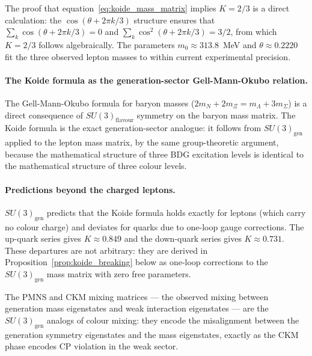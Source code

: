 \documentclass[11pt,a4paper]{article}
\begin{document}
The proof that equation~\eqref{eq:koide_mass_matrix} implies $K = 2/3$
is a direct calculation: the $\cos(\theta + 2\pi k/3)$ structure ensures
that $\sum_k \cos(\theta + 2\pi k/3) = 0$ and
$\sum_k \cos^2(\theta + 2\pi k/3) = 3/2$, from which $K = 2/3$ follows
algebraically. The parameters $m_0 \approx 313.8$~MeV and $\theta \approx
0.2220$ fit the three observed lepton masses to within current experimental
precision.

\paragraph{The Koide formula as the generation-sector Gell-Mann-Okubo relation.}
The Gell-Mann-Okubo formula for baryon masses ($2m_N + 2m_\Xi = m_\Lambda + 3m_\Sigma$)
is a direct consequence of $SU(3)_{\mathrm{flavour}}$ symmetry on the baryon
mass matrix. The Koide formula is the exact generation-sector analogue: it
follows from $SU(3)_{\mathrm{gen}}$ applied to the lepton mass matrix, by
the same group-theoretic argument, because the mathematical structure of three
BDG excitation levels is identical to the mathematical structure of three
colour levels.

\paragraph{Predictions beyond the charged leptons.}
$SU(3)_{\mathrm{gen}}$ predicts that the Koide formula holds exactly for
leptons (which carry no colour charge) and deviates for quarks due to
one-loop gauge corrections. The up-quark series gives $K \approx 0.849$
and the down-quark series gives $K \approx 0.731$. These departures are
not arbitrary: they are derived in Proposition~\ref{prop:koide_breaking}
below as one-loop corrections to the $SU(3)_{\mathrm{gen}}$ mass matrix
with zero free parameters.

The PMNS and CKM mixing matrices --- the observed mixing between generation
mass eigenstates and weak interaction eigenstates --- are the $SU(3)_{\mathrm{gen}}$
analogs of colour mixing: they encode the misalignment between the generation
symmetry eigenstates and the mass eigenstates, exactly as the CKM phase encodes
CP violation in the weak sector.
\end{document}
